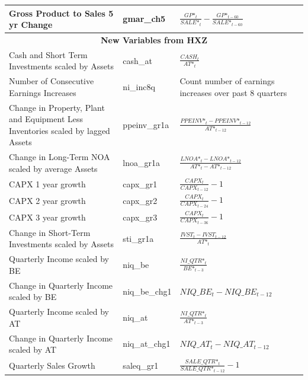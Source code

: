 \documentclass[12pt,title,fleqn]{article}
\begin{document}
{\begin{longtable}{@{\extracolsep{\fill}}|p{6cm}|l|p{8cm}|@{}}
    Gross Product to Sales 5 yr Change & gmar\_ch5 & $\frac{GP\mbox{*}_t}{SALE\mbox{*}_t} - \frac{GP\mbox{*}_{t-60}}{SALE\mbox{*}_{t-60}}$\\
	
    \hline 
	\multicolumn{3}{|c|}{\textbf{New Variables from HXZ}} \\
	\hline 		
	
    Cash and Short Term Investments scaled by Assets & cash\_at &$\frac{CASH_t}{AT\mbox{*}_t}$ \\
	
	Number of Consecutive Earnings Increases & ni\_inc8q &
	Count number of earnings increases over past 8 quarters \\
	
	Change in Property, Plant and Equipment Less Inventories scaled by lagged Assets & ppeinv\_gr1a &$\frac{PPEINV\mbox{*}_t - PPEINV\mbox{*}_{t-12}}{AT\mbox{*}_{t-12}}$\\
	
	Change in Long-Term NOA scaled by average Assets & lnoa\_gr1a & $ \frac{LNOA\mbox{*}_t - LNOA\mbox{*}_{t-12}}{AT\mbox{*}_t - AT\mbox{*}_{t-12}}$\\
	
	CAPX 1 year growth & capx\_gr1 & $\frac{CAPX_t}{CAPX_{t-12}} - 1$\\
	
	CAPX 2 year growth & capx\_gr2 & $\frac{CAPX_t}{CAPX_{t-24}} - 1$\\
	
	CAPX 3 year growth & capx\_gr3 & $ \frac{CAPX_t}{CAPX_{t-36}} - 1$ \\
	
	Change in Short-Term Investments scaled by Assets & sti\_gr1a &$ \frac{IVST_t - IVST_{t-12}}{AT\mbox{*}_t} $\\
	
	Quarterly Income scaled by BE & niq\_be & $\frac{NI\_QTR\mbox{*}_t}{BE\mbox{*}_{t-3}}$\\
	
	Change in Quarterly Income scaled by BE & niq\_be\_chg1 &$ NIQ\_BE_t - NIQ\_BE_{t-12}$\\
	
	Quarterly Income scaled by AT & niq\_at & $\frac{NI\_QTR\mbox{*}_t}{AT\mbox{*}_{t-3}}$\\
	
	Change in Quarterly Income scaled by AT & niq\_at\_chg1 &$NIQ\_AT_t - NIQ\_AT_{t-12}$\\
	
	Quarterly Sales Growth & saleq\_gr1 & $\frac{SALE\_QTR\mbox{*}_t}{SALE\_QTR\mbox{*}_{t-12}} - 1$ \\
	

\end{longtable}}
\end{document}
